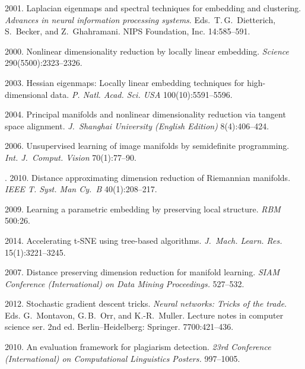 \begin{multicols}{2}
{{\begin{thebibliography}{99}
  2001. Laplacian eigenmaps and spectral techniques for embedding and clustering. 
  \textit{Advances in neural information processing systems}.
  Eds.\ T.\,G.~Dietterich, S.~Becker, and Z.~Ghahramani.
  NIPS Foundation, Inc. 14:585--591.

 2000. 
Nonlinear dimensionality reduction by locally linear embedding. 
\textit{Science} 290(5500):2323--2326.

 2003. 
Hessian eigenmaps: Locally linear embedding techniques for high-dimensional data. 
\textit{P. Natl. Acad. Sci. USA} 100(10):5591--5596.

  2004. Principal manifolds and nonlinear dimensionality reduction via tangent space
   alignment. \textit{J.~Shanghai University (English Edition)} 
8(4):406--424.

  2006. Unsupervised learning of image manifolds by semidefinite programming. 
  \textit{Int. J.~Comput. Vision} 70(1):77--90.

 . 2010. 
 Distance approximating dimension reduction of Riemannian manifolds. 
 \textit{IEEE T. Syst. Man Cy.~B} 
 40(1):208--217.

 2009. Learning a parametric embedding by preserving 
local structure. \textit{RBM} 500:26.

   2014. 
  Accelerating t-SNE using tree-based algorithms. 
  \textit{J.~Mach. Learn. Res.} 15(1):3221--3245.

2007. Distance preserving dimension reduction for manifold learning. 
\textit{SIAM  Conference (International) on Data Mining Proceedings.} 527--532.
{

}

 2012. Stochastic gradient descent tricks. 
\textit{Neural networks: Tricks of the trade}. 
Eds. G.~Montavon, G.\,B.~Orr, and K.-R.~Muller. 
Lecture notes in computer science ser. 2nd ed. Berlin--Heidelberg: 
Springer. 7700:421--436.

  2010. An evaluation framework for plagiarism detection. 
 \textit{23rd Conference (International) on Computational Linguistics 
 Posters.} 997--1005.
\end{thebibliography}

 }
 }

\end{multicols}

